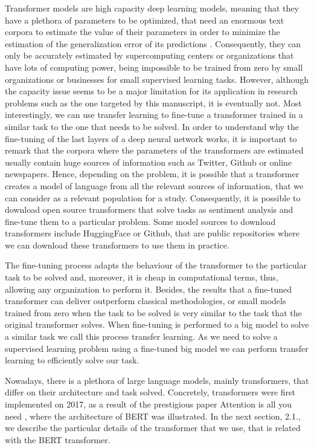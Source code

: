 \documentclass[runningheads]{llncs}
\begin{document}
Transformer models are high capacity deep learning models, meaning that they have a plethora of parameters to be optimized, that need an enormous text corpora to estimate the value of their parameters in order to minimize the estimation of the generalization error of its predictions \cite{lecun2015deep}. Consequently, they can only be accurately estimated by supercomputing centers or organizations that have lots of computing power, being impossible to be trained from zero by small organizations or businesses for small supervised learning tasks. However, although the capacity issue seems to be a major limitation for its application in research problems such as the one targeted by this manuscript, it is eventually not. Most interestingly, we can use transfer learning to fine-tune a transformer trained in a similar task to the one that needs to be solved. In order to understand why the fine-tuning of the last layers of a deep neural network works, it is important to remark that the corpora where the parameters of the transformers are estimated usually contain huge sources of information such as Twitter, Github or online newspapers. Hence, depending on the problem, it is possible that a transformer creates a model of language from all the relevant sources of information, that we can consider as a relevant population for a study. Consequently, it is possible to download open source transformers that solve tasks as sentiment analysis and fine-tune them to a particular problem. Some model sources to download transformers include HuggingFace or Github, that are public repositories where we can download these transformers to use them in practice. 

The fine-tuning process adapts the behaviour of the transformer to the particular task to be solved and, moreover, it is cheap in computational terms, thus, allowing any organization to perform it. Besides, the results that a fine-tuned transformer can deliver outperform classical methodologies, or small models trained from zero \cite{gonzalez2020comparing} when the task to be solved is very similar to the task that the original transformer solves. When fine-tuning is performed to a big model to solve a similar task we call this process transfer learning. As we need to solve a supervised learning problem using a fine-tuned big model we can perform transfer learning to efficiently solve our task. 

Nowadays, there is a plethora of large language models, mainly transformers, that differ on their architecture and task solved. Concretely, transformers were first implemented on 2017, as a result of the prestigious paper Attention is all you need \cite{vaswani2017attention}, where the architecture of BERT was illustrated. In the next section, 2.1., we describe the particular details of the transformer that we use, that is related with the BERT transformer. 
\end{document}
